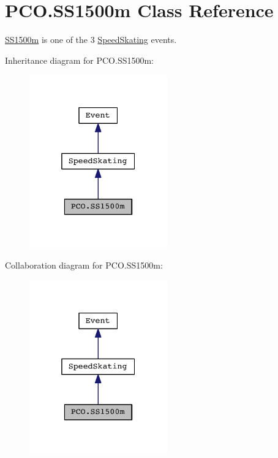 \hypertarget{classPCO_1_1SS1500m}{\section{P\+C\+O.\+S\+S1500m Class Reference}
\label{classPCO_1_1SS1500m}
}


\hyperlink{classPCO_1_1SS1500m}{S\+S1500m} is one of the 3 \hyperlink{classPCO_1_1SpeedSkating}{Speed\+Skating} events.  




Inheritance diagram for P\+C\+O.\+S\+S1500m\+:\nopagebreak
\begin{figure}[H]
\begin{center}
\leavevmode
\includegraphics[width=169pt]{classPCO_1_1SS1500m__inherit__graph}
\end{center}
\end{figure}


Collaboration diagram for P\+C\+O.\+S\+S1500m\+:\nopagebreak
\begin{figure}[H]
\begin{center}
\leavevmode
\includegraphics[width=169pt]{classPCO_1_1SS1500m__coll__graph}
\end{center}
\end{figure}
